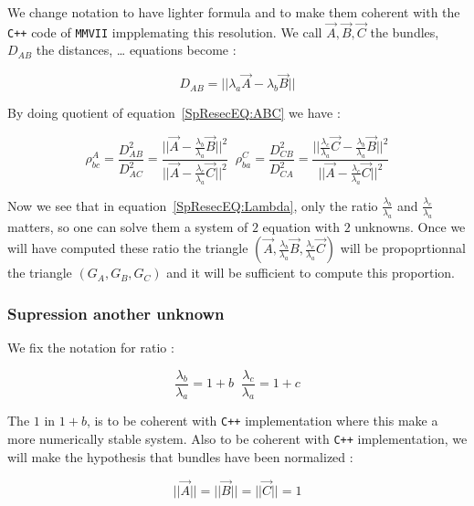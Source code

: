 We change notation to have lighter formula and to make them coherent with the {\tt C++} code of {\tt MMVII}
impplemating this resolution. We call $\Vec{A} , \Vec{B}, \Vec{C}$  the bundles, $D_{AB}$ the distances, \dots
equations become :

\begin{equation}
	D_{AB} = || \lambda_a \Vec{A} -  \lambda_{b} \Vec{B} || \label{SpResecEQ:ABC}
\end{equation}

By doing quotient of equation~\ref{SpResecEQ:ABC} we have :

\begin{equation}
	\rho^A_{bc}  
	=	\frac{D^2_{AB}}{D^2_{AC}} 
	= \frac{|| \Vec{A} -  \frac{\lambda_{b}}{\lambda_{a}} \Vec{B} ||^2 }{||\Vec{A} -  \frac{\lambda_{c}}{\lambda_{a}} \Vec{C}||^2}
	\;\;
	\rho^C_{ba}  
	=	\frac{D^2_{CB}}{D^2_{CA}} 
	= \frac{|| \frac{\lambda_{c}}{\lambda_{a}} \Vec{C} -  \frac{\lambda_{b}}{\lambda_{a}} \Vec{B} ||^2 }
	       {||\Vec{A} -  \frac{\lambda_{c}}{\lambda_{a}} \Vec{C}||^2}
	       \label{SpResecEQ:Lambda}
\end{equation}

Now we see that in equation~\ref{SpResecEQ:Lambda}, only the ratio $\frac{\lambda_{b}}{\lambda_{a}}$ and $\frac{\lambda_{c}}{\lambda_{a}}$
matters, so one can solve them a system of $2$ equation with $2$ unknowns. Once we will have computed these ratio the triangle
$(\Vec{A} , \frac{\lambda_{b}}{\lambda_{a}} \Vec{B},  \frac{\lambda_{c}}{\lambda_{a}} \Vec{C})$ will be propoprtionnal the
triangle $(G_A,G_B,G_C)$ and it will be sufficient to compute this proportion.


\subsubsection{Supression another unknown}

We fix the notation for ratio :

\begin{equation}
	\frac{\lambda_{b}}{\lambda_{a}} = 1+ b  \;\;
	\frac{\lambda_{c}}{\lambda_{a}} = 1+ c
\end{equation}


The $1$ in $1+b$, is to be coherent with {\tt C++} implementation where this make a more numerically stable system.
Also to be coherent with {\tt C++} implementation, we will make the hypothesis that bundles have been normalized :

\begin{equation}
	|| \Vec{A}|| = || \Vec{B}|| = || \Vec{C}|| = 1
\end{equation}

